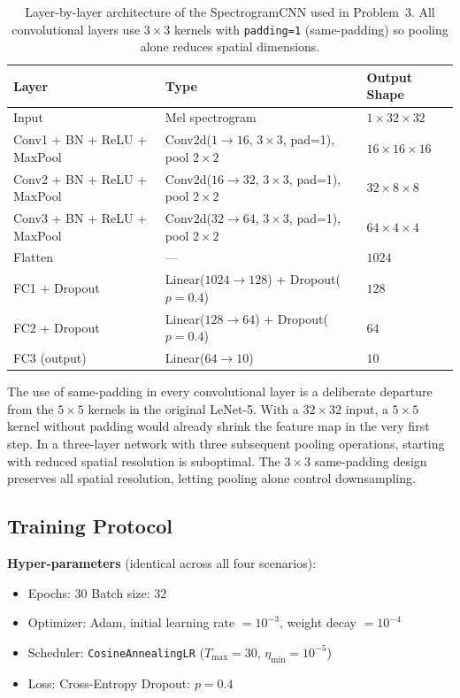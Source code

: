 \documentclass[12pt, a4paper]{article}
\renewcommand{\arraystretch}{1.12}
\begin{document}
\begin{table}[H]
\centering
\renewcommand{\arraystretch}{1.3}
\begin{tabular}{l l l}
\toprule
\textbf{Layer} & \textbf{Type} & \textbf{Output Shape} \\
\midrule
Input
  & Mel spectrogram
  & $1\times32\times32$ \\
Conv1 + BN + ReLU + MaxPool
  & Conv2d($1{\to}16$, $3{\times}3$, pad=1), pool $2{\times}2$
  & $16\times16\times16$ \\
Conv2 + BN + ReLU + MaxPool
  & Conv2d($16{\to}32$, $3{\times}3$, pad=1), pool $2{\times}2$
  & $32\times8\times8$ \\
Conv3 + BN + ReLU + MaxPool
  & Conv2d($32{\to}64$, $3{\times}3$, pad=1), pool $2{\times}2$
  & $64\times4\times4$ \\
Flatten
  & ---
  & $1024$ \\
FC1 + Dropout
  & Linear($1024{\to}128$) + Dropout($p=0.4$)
  & $128$ \\
FC2 + Dropout
  & Linear($128{\to}64$) + Dropout($p=0.4$)
  & $64$ \\
FC3 (output)
  & Linear($64{\to}10$)
  & $10$ \\
\bottomrule
\end{tabular}
\caption{Layer-by-layer architecture of the SpectrogramCNN used in Problem~3.
         All convolutional layers use $3\times3$ kernels with \texttt{padding=1}
         (same-padding) so pooling alone reduces spatial dimensions.}
\label{tab:q3_arch}
\end{table}

The use of same-padding in every convolutional layer is a deliberate departure from the
$5\times5$ kernels in the original LeNet-5. With a $32\times32$ input, a $5\times5$
kernel without padding would already shrink the feature map in the very first step.
In a three-layer network with three subsequent pooling operations, starting with
reduced spatial resolution is suboptimal. The $3\times3$ same-padding design
preserves all spatial resolution, letting pooling alone control downsampling.

\subsection{Training Protocol}

\textbf{Hyper-parameters} (identical across all four scenarios):
\begin{itemize}
    \item Epochs: 30 \quad Batch size: 32
    \item Optimizer: Adam, initial learning rate $= 10^{-3}$, weight decay $= 10^{-4}$
    \item Scheduler: \texttt{CosineAnnealingLR} ($T_{\max} = 30$, $\eta_{\min} = 10^{-5}$)
    \item Loss: Cross-Entropy \quad Dropout: $p = 0.4$
\end{itemize}
\end{document}
